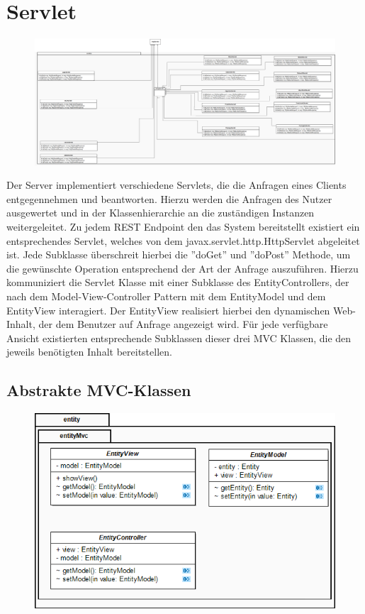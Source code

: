 \section{Servlet}

\begin{figure}[h]
\includegraphics[width=0.8\linewidth]{Grafik/Klassendiagramme/Servlet.png}
\end{figure}


Der Server implementiert verschiedene Servlets, die die Anfragen eines Clients entgegennehmen und beantworten. Hierzu werden die Anfragen des Nutzer ausgewertet und in der Klassenhierarchie an die zuständigen Instanzen weitergeleitet. Zu jedem REST Endpoint den das System bereitstellt existiert ein entsprechendes Servlet, welches von dem javax.servlet.http.HttpServlet abgeleitet ist. Jede Subklasse überschreit hierbei die ''doGet'' und ''doPost'' Methode, um die gewünschte Operation entsprechend der Art der Anfrage auszuführen. Hierzu kommuniziert die Servlet Klasse mit einer Subklasse des EntityControllers, der nach dem Model-View-Controller Pattern mit dem EntityModel und dem EntityView interagiert. Der EntityView realisiert hierbei den dynamischen Web-Inhalt, der dem Benutzer auf Anfrage angezeigt wird. Für jede verfügbare Ansicht existierten entsprechende Subklassen dieser drei MVC Klassen, die den jeweils benötigten Inhalt bereitstellen. 


\subsection{Abstrakte MVC-Klassen}

\begin{figure}[h]
\centering
\includegraphics[width=0.5\linewidth]{Grafik/Klassendiagramme/Entity_mvc.png}
\end{figure}
